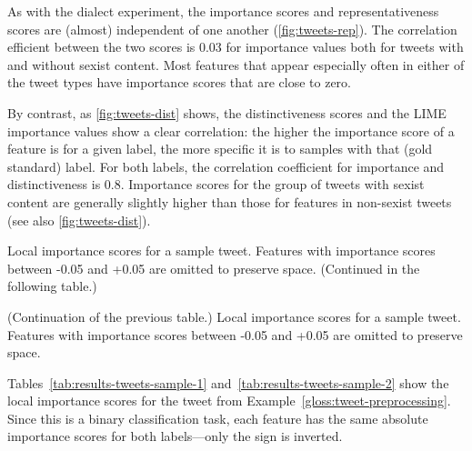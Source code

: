 As with the dialect experiment, the importance scores and representativeness scores are (almost) independent of one another (\autoref{fig:tweets-rep}).
The correlation efficient between the two scores is 0.03 for importance values both for tweets with and without sexist content.
Most features that appear especially often in either of the tweet types have importance scores that are close to zero.

By contrast, as \autoref{fig:tweets-dist} shows, the distinctiveness scores and the LIME importance values show a clear correlation: the higher the importance score of a feature is for a given label, the more specific it is to samples with that (gold standard) label.
For both labels, the correlation coefficient for importance and distinctiveness is 0.8.
Importance scores for the group of tweets with sexist content are generally slightly higher than those for features in non-sexist tweets (see also \autoref{fig:tweets-dist}).

\begin{table}[htbp]
    
    \caption[Local importance scores for a sample tweet]
    {Local importance scores for a sample tweet.
    Features with importance scores between -0.05 and +0.05 are omitted to preserve space.
    (Continued in the following table.)}
    \label{tab:results-tweets-sample-1}
\end{table}
\begin{table}[htbp]
    
    \caption[Local importance scores for a sample tweet (continued)]
    {(Continuation of the previous table.)
    Local importance scores for a sample tweet.
    Features with importance scores between -0.05 and +0.05 are omitted to preserve space.}
    \label{tab:results-tweets-sample-2}
\end{table}

Tables~\ref{tab:results-tweets-sample-1} and~\ref{tab:results-tweets-sample-2} show the local importance scores for the tweet from Example~\ref{gloss:tweet-preprocessing}.
Since this is a binary classification task, each feature has the same absolute importance scores for both labels---only the sign is inverted.

